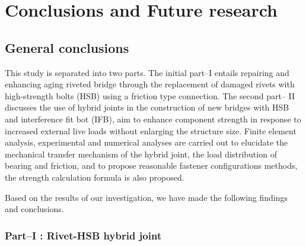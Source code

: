 \chapter{Conclusions and Future research}
\label{ch8}

\begin{spacing}{1.25} %
\minitoc %
\end{spacing} %
\onehalfspacing %

\section{General conclusions}

This study is separated into two parts. The initial part--\RN{1} entails repairing and enhancing aging riveted bridge through the replacement of damaged rivets with high-strength bolts (HSB) using a friction type connection. The second part-- \RN{2} discusses the use of hybrid joints in the construction of new bridges with HSB and interference fit bot (IFB), aim to enhance component strength in response to increased external live loads without enlarging the structure size. Finite element analysis, experimental and numerical analyses are carried out to elucidate the mechanical transfer mechanism of the hybrid joint, the load distribution of bearing and friction, and to propose reasonable fastener configurations methods, the strength calculation formula is also proposed.

Based on the results of our investigation, we have made the following findings and conclusions. \par

\subsection*{Part--\RN{1} : Rivet-HSB hybrid joint}

